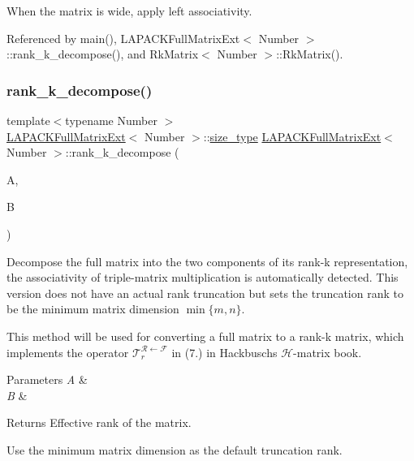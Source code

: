 When the matrix is wide, apply left associativity.

Referenced by main(), L\+A\+P\+A\+C\+K\+Full\+Matrix\+Ext$<$ Number $>$\+::rank\+\_\+k\+\_\+decompose(), and Rk\+Matrix$<$ Number $>$\+::\+Rk\+Matrix().

\mbox{\label{classLAPACKFullMatrixExt_af4406db24d0924c5f7e891336bfbcffe}} 
\subsubsection{\texorpdfstring{rank\+\_\+k\+\_\+decompose()}{rank\_k\_decompose()}\hspace{0.1cm}{\footnotesize\ttfamily [2/3]}}
{\footnotesize\ttfamily template$<$typename Number $>$ \\
\hyperlink{classLAPACKFullMatrixExt}{L\+A\+P\+A\+C\+K\+Full\+Matrix\+Ext}$<$ Number $>$\+::\hyperlink{classLAPACKFullMatrixExt_a5cf5f4a6104dc17029210b5ca52bf574}{size\+\_\+type} \hyperlink{classLAPACKFullMatrixExt}{L\+A\+P\+A\+C\+K\+Full\+Matrix\+Ext}$<$ Number $>$\+::rank\+\_\+k\+\_\+decompose (\begin{DoxyParamCaption}\item[{\hyperlink{classLAPACKFullMatrixExt}{L\+A\+P\+A\+C\+K\+Full\+Matrix\+Ext}$<$ Number $>$ \&}]{A,  }\item[{\hyperlink{classLAPACKFullMatrixExt}{L\+A\+P\+A\+C\+K\+Full\+Matrix\+Ext}$<$ Number $>$ \&}]{B }\end{DoxyParamCaption})}

Decompose the full matrix into the two components of its rank-\/k representation, the associativity of triple-\/matrix multiplication is automatically detected. This version does not have an actual rank truncation but sets the truncation rank to be the minimum matrix dimension $\min\{m, n\}$.


\begin{DoxyDescription}
\item[Note ]This method will be used for converting a full matrix to a rank-\/k matrix, which implements the operator $\mathcal{T}_{r}^{\mathcal{R} \leftarrow \mathcal{F}}$ in (7.) in Hackbusch\textquotesingle{}s $\mathcal{H}$-\/matrix book. 
\end{DoxyDescription}
\begin{DoxyParams}{Parameters}
{\em A} & \\
\hline
{\em B} & \\
\hline
\end{DoxyParams}
\begin{DoxyReturn}{Returns}
Effective rank of the matrix. 
\end{DoxyReturn}
Use the minimum matrix dimension as the default truncation rank.

